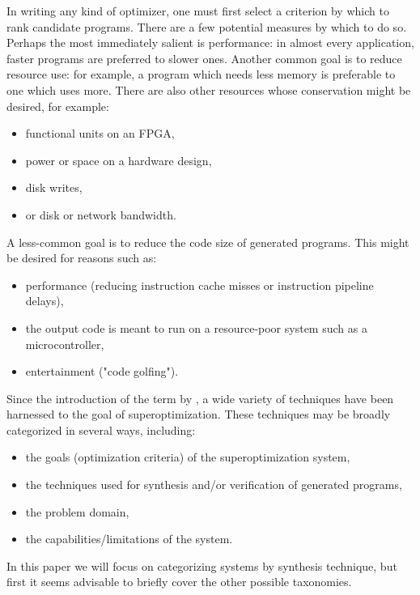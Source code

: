 \documentclass[12pt,twoside]{reedthesis}
\newcommand{\addressed}[2]{{#1}}
\begin{document}
    In writing any kind of optimizer, one must first select a criterion by which to rank candidate programs.
    There are
        \addressed{a few potential measures by which to do so.}{Related to the comment above, these are independent of superoptimization so I would introduce them first in the context of classical optimization}
    Perhaps the most immediately salient is performance:
        in almost every application, faster programs are preferred to slower ones.
    Another common goal is to reduce resource use: 
        for example, a program which needs less memory is \addressed{preferable}{typical practice is to find something to cite for these kinds of claims (maybe just pick some paper that introduce a technique for minimizing memory usage)}
            to one which uses more.
    There are also other resources whose conservation might be desired, for example:
    \begin{itemize}
        \item functional units on an FPGA, \addressed{}{Similarly, citations here would be ideal (but I wouldn't make this a high priority)}
        \item power or space on a hardware design, 
        \item disk writes, 
        \item or disk or network bandwidth.
    \end{itemize}
    A less-common goal is to reduce the code size of generated programs.
    This might be desired for reasons such as:
    \begin{itemize}
            \item performance (reducing instruction cache misses or instruction pipeline delays), 
            \item the output code is meant to run on a resource-poor system such as a microcontroller, 
            \item entertainment ("code golfing").
    \end{itemize}
    
    Since the introduction of the term by \cite{massalin1987superoptimizer}, a wide variety of techniques have been harnessed to the goal of superoptimization.
    These techniques may be broadly categorized in several ways, including:
        \begin{itemize}
            \item the goals (optimization criteria) of the superoptimization system,
            \item the techniques used for synthesis and/or verification of generated programs,
            \item the problem domain,
            \item the capabilities/limitations of the system.
        \end{itemize}
    In this paper we will focus on categorizing systems by synthesis technique, but first it seems advisable to briefly cover the other possible taxonomies.
    
\end{document}
